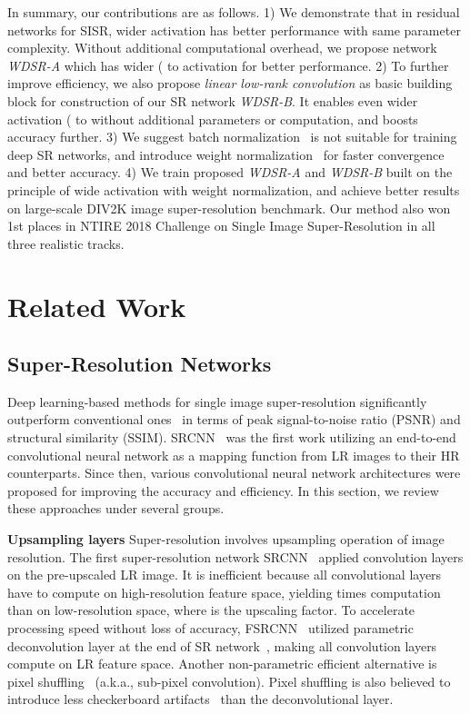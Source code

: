 \documentclass{article}
\begin{document}
In summary, our contributions are as follows. 1) We demonstrate that in residual networks for SISR, wider activation has better performance with same parameter complexity. Without additional computational overhead, we propose network \textit{WDSR-A} which has wider ( to  activation for better performance. 2) To further improve efficiency, we also propose \textit{linear low-rank convolution} as basic building block for construction of our SR network \textit{WDSR-B}. It enables even wider activation ( to  without additional parameters or computation, and boosts accuracy further. 3) We suggest batch normalization~\cite{ioffe2015batch} is not suitable for training deep SR networks, and introduce weight normalization~\cite{salimans2016weight} for faster convergence and better accuracy. 4) We train proposed \textit{WDSR-A} and \textit{WDSR-B} built on the principle of wide activation with weight normalization, and achieve better results on large-scale DIV2K image super-resolution benchmark. Our method also won 1st places in NTIRE 2018 Challenge on Single Image Super-Resolution in all three realistic tracks. 
\section{Related Work}

\subsection{Super-Resolution Networks}
Deep learning-based methods for single image super-resolution significantly outperform conventional ones~\cite{park2003super, yang2010image} in terms of peak signal-to-noise ratio (PSNR) and structural similarity (SSIM). SRCNN~\cite{dong2014learning} was the first work utilizing an end-to-end convolutional neural network as a mapping function from LR images to their HR counterparts. Since then, various convolutional neural network architectures were proposed for improving the accuracy and efficiency. In this section, we review these approaches under several groups.

\textbf{Upsampling layers} Super-resolution involves upsampling operation of image resolution. The first super-resolution network SRCNN~\cite{dong2014learning} applied convolution layers on the pre-upscaled LR image. It is inefficient because all convolutional layers have to compute on high-resolution feature space, yielding  times computation than on low-resolution space, where  is the upscaling factor. To accelerate processing speed without loss of accuracy, FSRCNN~\cite{dong2016accelerating} utilized parametric deconvolution layer at the end of SR network~\cite{dong2016accelerating}, making all convolution layers compute on LR feature space. Another non-parametric efficient alternative is pixel shuffling~\cite{shi2016real} (a.k.a., sub-pixel convolution). Pixel shuffling is also believed to introduce less checkerboard artifacts~\cite{odena2016deconvolution} than the deconvolutional layer.
\end{document}
